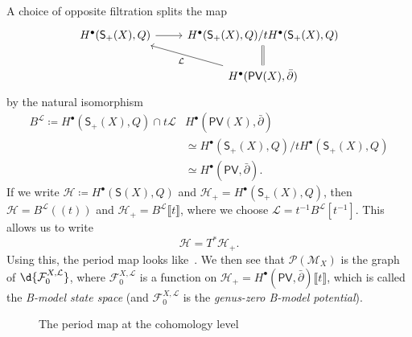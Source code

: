 \documentclass[article,10pt,oneside,oldfontcommands]{memoir}
\theoremstyle{definition}
\theoremstyle{remark}
\theoremstyle{plain}
\theoremstyle{definition}
\theoremstyle{remark}
\newcommand{\mc}[1]{\mathcal{#1}}
\newcommand{\ms}[1]{\mathsf{#1}}
\newcommand{\1}{\mathbf{1}}
\newcommand{\2}{\mathbf{2}}
\newcommand{\3}{\mathbf{3}}
\newcommand{\ps}[1]{\lBrack #1 \rBrack}
\newcommand{\ls}[1]{(\!( #1 )\!)}
\newcommand{\dbar}{\bar{\partial}}
\begin{document}
A choice of opposite filtration splits the map
\begin{equation*}
\begin{tikzcd}
     H^{\bullet}(\ms{S}_+(X), Q) \ar{r} & H^{\bullet}(\ms{S}_+(X), Q) / t H^{\bullet}(\ms{S}_+(X), Q) \ar[equals]{d} \\
     & H^{\bullet}(\ms{PV}(X), \dbar) \ar{ul}{\mc{L}}
\end{tikzcd}
\end{equation*}
by the natural isomorphism
\begin{align*}
    B^{\mc{L}} \coloneqq H^{\bullet}(\ms{S}_+(X), Q) \cap t \mc{L} & H^{\bullet}(\ms{PV}(X), \dbar) \\
    &\simeq H^{\bullet}(\ms{S}_+(X), Q) / t H^{\bullet}(\ms{S}_+(X), Q) \\ 
    &\simeq H^{\bullet}(\ms{PV}, \dbar).
\end{align*}
If we write \(\mc{H} \coloneqq H^{\bullet}(\ms{S}(X), Q)\) and \(\mc{H}_+ = H^{\bullet}(\ms{S}_+(X), Q)\), then \(\mc{H} = B^{\mc{L}}\ls{t}\) and \(\mc{H}_+ = B^{\mc{L}} \ps{t}\), where we choose \(\mc{L} = t^{-1} B^{\mc{L}} [t^{-1}]\). This allows us to write
\[ \mc{H} = T^* \mc{H}_+. \]
Using this, the period map looks like~. We then see that \(\mc{P}(\mc{M}_X)\) is the graph of \(\d{\mc{F}_0^{X, \mc{L}}}\), where \(\mc{F}_0^{X, \mc{L}}\) is a function on \(\mc{H}_+ = H^{\bullet}(\ms{PV}, \dbar) \ps{t}\), which is called the \textit{B-model state space} (and \(\mc{F}_0^{X, \mc{L}}\) is the \textit{genus-zero B-model potential}).

\begin{figure}[htpb]
\begin{center}
\end{center}
\caption{The period map at the cohomology level}%
\label{fig:cohomology-period-map}
\end{figure}
\end{document}
